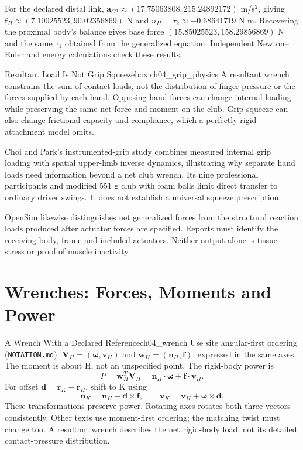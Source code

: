 For the declared distal link, \(\bm a_{C2}\approx(17.75063808,215.24892172)\) m/s\(^2\), giving \(\bm f_H\approx(7.10025523,90.02356869)\) N and \(n_H=\tau_2\approx-0.68641719\) N m. Recovering the proximal body's balance gives base force \((15.85025523,158.29856869)\) N and the same \(\tau_1\) obtained from the generalized equation. Independent Newton–Euler and energy calculations check these results.

\begin{laymansbox}{Resultant Load Is Not Grip Squeeze}{box:ch04_grip_physics}
A resultant wrench constrains the sum of contact loads, not the distribution of finger pressure or the forces supplied by each hand. Opposing hand forces can change internal loading while preserving the same net force and moment on the club. Grip squeeze can also change frictional capacity and compliance, which a perfectly rigid attachment model omits.

Choi and Park's instrumented-grip study combines measured internal grip loading with spatial upper-limb inverse dynamics, illustrating why separate hand loads need information beyond a net club wrench. Its nine professional participants and modified 551 g club with foam balls limit direct transfer to ordinary driver swings. It does not establish a universal squeeze prescription. \citep{Choi2020GripKinetics}

OpenSim likewise distinguishes net generalized forces from the structural reaction loads produced after actuator forces are specified. Reports must identify the receiving body, frame and included actuators. Neither output alone is tissue stress or proof of muscle inactivity. \citep{OpenSimJointReactions2019}
\end{laymansbox}

\section{Wrenches: Forces, Moments and Power}

\begin{definition}{A Wrench With a Declared Reference}{ch04_wrench}
Use site angular-first ordering (\texttt{NOTATION.md}):
\(\bm V_H=(\bm\omega,\bm v_H)\) and \(\bm w_H=(\bm n_H,\bm f)\), expressed in the same axes.
The moment is about H, not an unspecified point. The rigid-body power is
\[
P=\bm w_H^T\bm V_H=\bm n_H\cdot\bm\omega+\bm f\cdot\bm v_H.
\]
For offset \(\bm d=\bm r_K-\bm r_H\), shift to K using
\[
\bm n_K=\bm n_H-\bm d\times\bm f,\qquad
\bm v_K=\bm v_H+\bm\omega\times\bm d.
\]
These transformations preserve power. Rotating axes rotates both three-vectors consistently. Other texts use moment-first ordering; the matching twist must change too. A resultant wrench describes the net rigid-body load, not its detailed contact-pressure distribution. \citep{LynchParkWrenches}
\end{definition}

